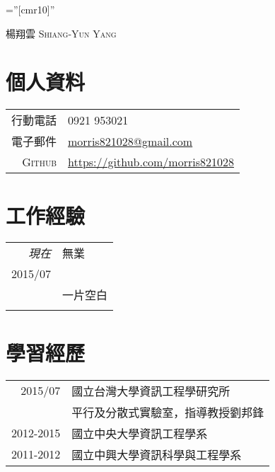 \documentclass[a4paper,10pt]{article}
\begin{document}

\pagestyle{empty} %

\font\fb=''[cmr10]'' %

\par{\centering
		{\Huge 楊翔雲 \textsc{Shiang-Yun Yang}
	}\bigskip\par}

\section{個人資料}

\begin{tabular}{rl}
    \textsc{行動電話} & 0921 953021\\
    \textsc{電子郵件} & \href{mailto:morris821028@gmail.com}{morris821028@gmail.com} \\
    \textsc{Github}  & \url{https://github.com/morris821028}
\end{tabular}

\section{工作經驗}
\begin{tabular}{r|p{11cm}}
 \emph{現在} & 無業 \\\textsc{2015/07}& \emph{}\\&\footnotesize{一片空白}\\\multicolumn{2}{c}{} \\
 
\end{tabular}

\section{學習經歷}
\begin{tabular}{rl}	
	2015/07 & 國立台灣大學資訊工程學研究所 \\
		& 平行及分散式實驗室，指導教授劉邦鋒 \\
	2012-2015 & 國立中央大學資訊工程學系 \\
	2011-2012 & 國立中興大學資訊科學與工程學系 \\
\end{tabular}
\end{document}

